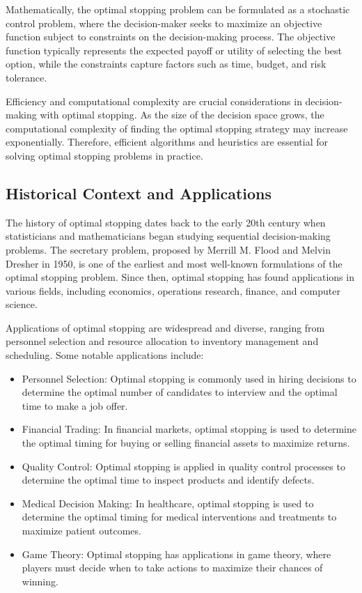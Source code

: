\documentclass[12pt]{book} %
\begin{document}
Mathematically, the optimal stopping problem can be formulated as a stochastic control problem, where the decision-maker seeks to maximize an objective function subject to constraints on the decision-making process. The objective function typically represents the expected payoff or utility of selecting the best option, while the constraints capture factors such as time, budget, and risk tolerance.

Efficiency and computational complexity are crucial considerations in decision-making with optimal stopping. As the size of the decision space grows, the computational complexity of finding the optimal stopping strategy may increase exponentially. Therefore, efficient algorithms and heuristics are essential for solving optimal stopping problems in practice.

\subsection{Historical Context and Applications}
The history of optimal stopping dates back to the early 20th century when statisticians and mathematicians began studying sequential decision-making problems. The secretary problem, proposed by Merrill M. Flood and Melvin Dresher in 1950, is one of the earliest and most well-known formulations of the optimal stopping problem. Since then, optimal stopping has found applications in various fields, including economics, operations research, finance, and computer science.

Applications of optimal stopping are widespread and diverse, ranging from personnel selection and resource allocation to inventory management and scheduling. Some notable applications include:

\begin{itemize}
    \item Personnel Selection: Optimal stopping is commonly used in hiring decisions to determine the optimal number of candidates to interview and the optimal time to make a job offer.
    \item Financial Trading: In financial markets, optimal stopping is used to determine the optimal timing for buying or selling financial assets to maximize returns.
    \item Quality Control: Optimal stopping is applied in quality control processes to determine the optimal time to inspect products and identify defects.
    \item Medical Decision Making: In healthcare, optimal stopping is used to determine the optimal timing for medical interventions and treatments to maximize patient outcomes.
    \item Game Theory: Optimal stopping has applications in game theory, where players must decide when to take actions to maximize their chances of winning.
\end{itemize}
\end{document}
